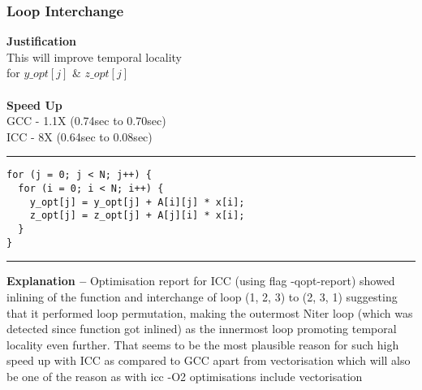 \documentclass[a4paper]{article}
\begin{document}
\subsubsection{\large\bf Loop Interchange }
\begin{minipage}{0.4\textwidth}
{\bf Justification} \\
This will improve temporal locality  \\ for $y\_opt[j]$ \& $z\_opt[j]$ \\ \\
{\bf Speed Up} \\
GCC - 1.1X (0.74sec to 0.70sec)\\ 
ICC - 8X (0.64sec to 0.08sec)\\
\end{minipage}
\begin{minipage}{0.6\textwidth}
\hrule
\begin{lstlisting}
for (j = 0; j < N; j++) {
  for (i = 0; i < N; i++) {
    y_opt[j] = y_opt[j] + A[i][j] * x[i];
    z_opt[j] = z_opt[j] + A[j][i] * x[i];
  }
}
\end{lstlisting}
\hrule 
\end{minipage}
\vspace{0.2cm}
\newline
{\bf Explanation -- } Optimisation report for ICC (using flag -qopt-report) showed inlining of the function and interchange of loop (1, 2, 3) to (2, 3, 1) suggesting that it performed loop permutation, making the outermost Niter loop (which was detected since function got inlined) as the innermost loop promoting temporal locality even further. That seems to be the most plausible reason for such high speed up with ICC as compared to GCC apart from vectorisation which will also be one of the reason as with icc -O2 optimisations include vectorisation
\end{document}
